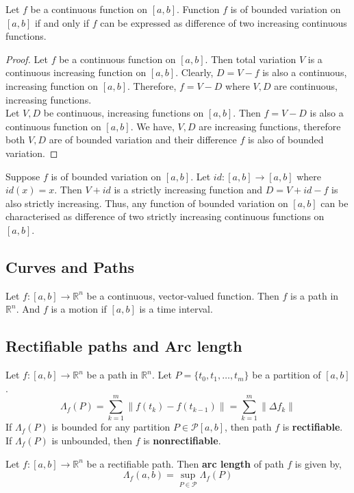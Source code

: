 \begin{theorem}
	Let $f$ be a continuous function on $[a,b]$.
	Function $f$ is of bounded variation on $[a,b]$ if and only if $f$ can be expressed as difference of two increasing continuous functions.
\end{theorem}
\begin{proof}
	Let $f$ be a continuous function on $[a,b]$.
	Then total variation $V$ is a continuous increasing function on $[a,b]$.
	Clearly, $D = V-f$ is also a continuous, increasing function on $[a,b]$.
	Therefore, $f = V - D$ where $V,D$ are continuous, increasing functions.\\

	Let $V,D$ be continuous, increasing functions on $[a,b]$.
	Then $f = V-D$ is also a continuous function on $[a,b]$.
	We have, $V,D$ are increasing functions, therefore both $V,D$ are of bounded variation and their difference $f$ is also of bounded variation.
\end{proof}

\begin{commentary}
	Suppose $f$ is of bounded variation on $[a,b]$.
	Let $id : [a,b] \to [a,b]$ where $id(x) = x$.
	Then $V+id$ is a strictly increasing function and $D = V+id-f$ is also strictly increasing.
	Thus, any function of bounded variation on $[a,b]$ can be characterised as difference of two strictly increasing continuous functions on $[a,b]$.
\end{commentary}
\subsection{Curves and Paths}
\begin{definition}[path]
	Let $f : [a,b] \to \mathbb{R}^n$ be a continuous, vector-valued function.
	Then $f$ is a path in $\mathbb{R}^n$.
	And $f$ is a motion if $[a,b]$ is a time interval.
\end{definition}
\subsection{Rectifiable paths and Arc length}
\begin{definition}
	Let $f : [a,b] \to \mathbb{R}^n$ be a path in $\mathbb{R}^n$.
	Let $P = \{ t_0,t_1,\dots,t_m \}$ be a partition of $[a,b]$.
	\[ \Lambda_f (P) = \sum_{k=1}^m \| f(t_k) - f(t_{k-1}) \| = \sum_{k=1}^m \| \Delta f_k \| \]
	If $\Lambda_f (P)$ is bounded for any partition $P \in \mathscr{P}[a,b]$, then path $f$ is \textbf{rectifiable}.
	If $\Lambda_f (P)$ is unbounded, then $f$ is \textbf{nonrectifiable}.\\
\end{definition}
\begin{definition}
	Let $f : [a,b] \to \mathbb{R}^n$ be a rectifiable path.
	Then \textbf{arc length} of path $f$ is given by,
	\[ \Lambda_f(a,b) = \sup_{P \in \mathscr{P}} \Lambda_f (P) \]
\end{definition}

